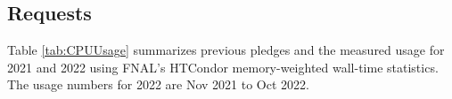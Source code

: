 \documentclass[12pt]{article}
\newcommand{\hrefII}[1]{\href{#1}{#1}}
\begin{document}
\subsection{Requests}




Table \ref{tab:CPUUsage} summarizes previous pledges\cite{CCB2022} and the measured usage  for 2021 and 2022 using FNAL's  HTCondor memory-weighted wall-time statistics\cite{fifemonDUNE}.  The  usage numbers for 2022 are Nov 2021 to Oct 2022. 




%
%
\pagebreak
\end{document}
